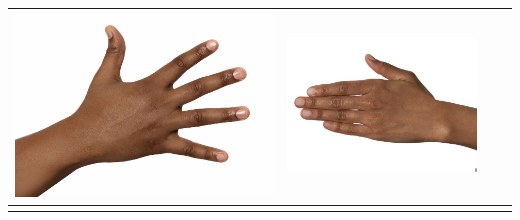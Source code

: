 \begin{longtable}{|N||c|c|c|}
\begin{minipage}{.29\textwidth}
    \includegraphics[width=\textwidth,height=\textheight,keepaspectratio]{../inputs/hand_dark.jpg}
  \end{minipage} & 
  \begin{minipage}{.29\textwidth}
    \includegraphics[width=\textwidth,height=\textheight,keepaspectratio]{../rc_test/outputs/20170516_proportional_test/hand_brown_to_hand_dark.jpg}
  \end{minipage} \\
\hline  \label{row:prop_test_hand_brown_to_hand_light} &
  \begin{minipage}{.29\textwidth}

\end{minipage}
\end{longtable}
